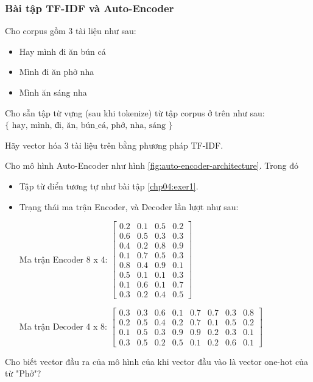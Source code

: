 \subsubsection{Bài tập TF-IDF và Auto-Encoder}
\begin{exer}
\label{chp04:exer1}
Cho corpus gồm 3 tài liệu như sau:

\begin{itemize}
    \item Hay mình đi ăn bún cá
    \item Mình đi ăn phở nha
    \item Mình ăn sáng nha
\end{itemize}

Cho sẵn tập từ vựng (sau khi tokenize) từ tập corpus ở trên như sau: \(\{\text{ hay, mình, đi, ăn, bún\_cá, phở, nha, sáng }\}\)

Hãy vector hóa 3 tài liệu trên bằng phương pháp TF-IDF.
\end{exer}

\begin{exer}
Cho mô hình Auto-Encoder như hình \ref{fig:auto-encoder-architecture}. Trong đó
\begin{itemize}
    \item Tập từ điển tương tự như bài tập \ref{chp04:exer1}.
    \item Trạng thái ma trận Encoder, và Decoder lần lượt như sau:

    Ma trận Encoder 8 x 4:
    $\begin{bmatrix}
     0.2 & 0.1 & 0.5 & 0.2 \\
     0.6 & 0.5 & 0.3 & 0.3 \\
     0.4 & 0.2 & 0.8 & 0.9 \\
     0.1 & 0.7 & 0.5 & 0.3 \\
     0.8 & 0.4 & 0.9 & 0.1 \\
     0.5 & 0.1 & 0.1 & 0.3 \\
     0.1 & 0.6 & 0.1 & 0.7 \\
     0.3 & 0.2 & 0.4 & 0.5
    \end{bmatrix}$

    Ma trận Decoder 4 x 8:
    $\begin{bmatrix}
     0.3 & 0.3 & 0.6 & 0.1 & 0.7 & 0.7 & 0.3 & 0.8 \\
     0.2 & 0.5 & 0.4 & 0.2 & 0.7 & 0.1 & 0.5 & 0.2 \\
     0.1 & 0.5 & 0.3 & 0.9 & 0.9 & 0.2 & 0.3 & 0.1 \\
     0.3 & 0.5 & 0.2 & 0.5 & 0.1 & 0.2 & 0.6 & 0.1
    \end{bmatrix}$
\end{itemize}
Cho biết vector đầu ra của mô hình của khi vector đầu vào là vector one-hot của từ "Phở"?
\end{exer}